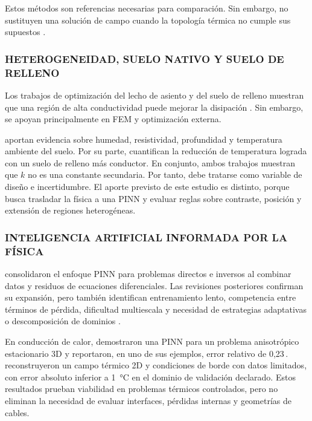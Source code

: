 \documentclass[11pt,a4paper,oneside]{report}
\newcommand{\pct}{\mbox{\char37}}
\begin{document}
Estos métodos son referencias necesarias para comparación. Sin embargo, no sustituyen una solución de campo cuando la topología térmica no cumple sus supuestos \parencites{iec60287}{iec60853}[3--4,93--99]{cigre2025}.

\subsubsection{HETEROGENEIDAD, SUELO NATIVO Y SUELO DE RELLENO}

Los trabajos de optimización del lecho de asiento y del suelo de relleno muestran que una región de alta conductividad puede mejorar la disipación \parencites[1--3]{oclon2015}[1--4]{atoccsa2024}. Sin embargo, se apoyan principalmente en FEM y optimización externa.

\textcite[1,6--9]{khumalo2025} aportan evidencia sobre humedad, resistividad, profundidad y temperatura ambiente del suelo. Por su parte, \textcite[1,10,16]{kim2025} cuantifican la reducción de temperatura lograda con un suelo de relleno más conductor. En conjunto, ambos trabajos muestran que $k$ no es una constante secundaria. Por tanto, debe tratarse como variable de diseño e incertidumbre. El aporte previsto de este estudio es distinto, porque busca trasladar la física a una PINN y evaluar reglas sobre contraste, posición y extensión de regiones heterogéneas.

\subsubsection{INTELIGENCIA ARTIFICIAL INFORMADA POR LA FÍSICA}

\textcite[686--690]{raissi2019} consolidaron el enfoque PINN para problemas directos e inversos al combinar datos y residuos de ecuaciones diferenciales. Las revisiones posteriores confirman su expansión, pero también identifican entrenamiento lento, competencia entre términos de pérdida, dificultad multiescala y necesidad de estrategias adaptativas o descomposición de dominios \parencites[1--2,14--17]{lawal2022}[2--6]{ren2025}.

En conducción de calor, \textcite[1,3,17]{xing2023} demostraron una PINN para un problema anisotrópico estacionario 3D y reportaron, en uno de sus ejemplos, error relativo de 0,23\,\pct. \textcite[1,3,16]{pan2025} reconstruyeron un campo térmico 2D y condiciones de borde con datos limitados, con error absoluto inferior a \SI{1}{\celsius} en el dominio de validación declarado. Estos resultados prueban viabilidad en problemas térmicos controlados, pero no eliminan la necesidad de evaluar interfaces, pérdidas internas y geometrías de cables.
\end{document}
